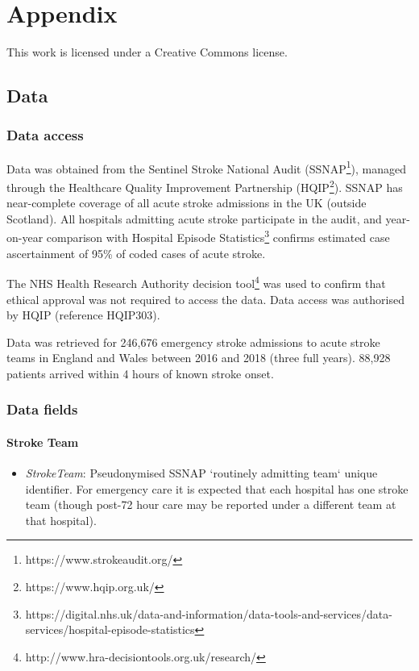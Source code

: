 \appendix
\section{Appendix}

This work is licensed under a Creative Commons  license.

\subsection{Data}

\subsubsection{Data access}

Data was obtained from the Sentinel Stroke National Audit (SSNAP\footnote{https://www.strokeaudit.org/}), managed through the Healthcare Quality Improvement Partnership (HQIP\footnote{https://www.hqip.org.uk/}). SSNAP has near-complete coverage of all acute stroke admissions in the UK (outside Scotland). All hospitals admitting acute stroke participate in the audit, and year-on-year comparison with Hospital Episode Statistics\footnote{https://digital.nhs.uk/data-and-information/data-tools-and-services/data-services/hospital-episode-statistics} confirms estimated case ascertainment of 95\% of coded cases of acute stroke.

The NHS Health Research Authority decision tool\footnote{http://www.hra-decisiontools.org.uk/research/} was used to confirm that ethical approval was not required to access the data. Data access was authorised by HQIP (reference HQIP303). 

Data was retrieved for 246,676 emergency stroke admissions to acute stroke teams in England and Wales between 2016 and 2018 (three full years). 88,928 patients arrived within 4 hours of known stroke onset.

\subsubsection{Data fields}

\paragraph{Stroke Team}

\begin{itemize}
\item \emph{StrokeTeam}: Pseudonymised SSNAP `routinely admitting team` unique
  identifier. For emergency care it is expected that each hospital has
  one stroke team (though post-72 hour care may be reported under a
  different team at that hospital).
\end{itemize}

